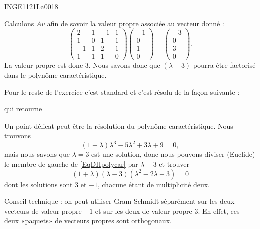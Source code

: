 

\begin{corrige}{INGE1121La0018}

	Calculons $Av$ afin de savoir la valeur propre associée au vecteur donné :
	\begin{equation}
		\begin{pmatrix}
			 2	&	1	&	-1	&	1	\\
			 1	&	0	&	1	&	1	\\
			 -1	&	1	&	2	&	1	\\ 
			 1	&	1	&	1	&	0	 
		 \end{pmatrix}
		 \begin{pmatrix}
			 -1	\\ 
			 0	\\ 
			 1	\\ 
			 0	
		 \end{pmatrix}
		 =
		 \begin{pmatrix}
			 -3	\\ 
			 0	\\ 
			 3	\\ 
			 0	
		 \end{pmatrix}.
	\end{equation}
	La valeur propre est donc $3$. Nous savons donc que $(\lambda-3)$ pourra être factorisé dans le polynôme caractéristique.

	Pour le reste de l'exercice c'est standard et c'est résolu de la façon suivante :


	qui retourne


	Un point délicat peut être la résolution du polynôme caractéristique. Nous trouvons
	\begin{equation}	\label{EqDHpolycar}
		(1+\lambda)\lambda^3-5\lambda^2+3\lambda+9=0,
	\end{equation}
	mais nous savons que $\lambda=3$ est une solution, donc nous pouvons diviser (Euclide) le membre de gauche de \eqref{EqDHpolycar} par $\lambda-3$ et trouver 
	\begin{equation}
		(1+\lambda)(\lambda-3)(\lambda^2-2\lambda-3)=0
	\end{equation}
	dont les solutions sont $3$ et $-1$, chacune étant de multiplicité deux.

	Conseil technique : on peut utiliser Gram-Schmidt séparément sur les deux vecteurs de valeur propre $-1$ et sur les deux de valeur propre $3$. En effet, ces deux «paquets» de vecteurs propres sont orthogonaux.

\end{corrige}
